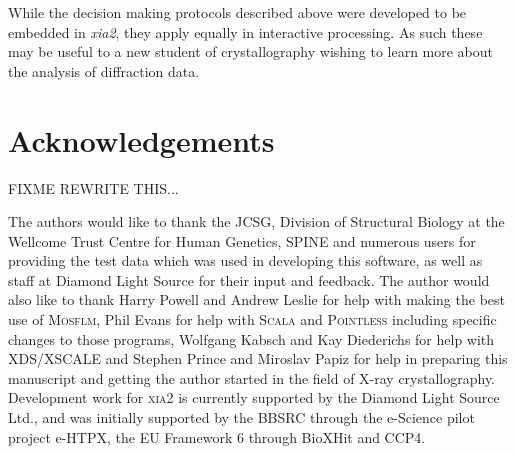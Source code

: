 \documentclass[preprint,pdf]{iucr}
\begin{document}
While the decision making protocols described above were developed to
be embedded in \emph{xia2}, they apply equally in interactive
processing. As such these may be useful to a new student of
crystallography wishing to learn more about the analysis of
diffraction data.

\section{Acknowledgements}

FIXME REWRITE THIS...

The authors would like to thank the JCSG, Division of Structural Biology at
the Wellcome Trust Centre for Human Genetics,
SPINE and numerous users for providing the test data which was used in 
developing this software, as well as staff at Diamond Light Source for 
their input and feedback.
The author would also like to thank Harry Powell
and Andrew Leslie for help with making the best use of \textsc{Mosflm},
Phil Evans for help with \textsc{Scala} and \textsc{Pointless} including 
specific changes to those programs, Wolfgang Kabsch and Kay Diederichs
for help with XDS/XSCALE and Stephen Prince and Miroslav Papiz
for help in preparing this manuscript and getting the author started in the
field of X-ray crystallography. 
Development work for \textsc{xia2} is currently supported by the Diamond
Light Source Ltd., and was initially supported by the BBSRC
through the e-Science pilot project e-HTPX, the EU Framework 6 through 
BioXHit and CCP4.

{}
%

\end{document}
